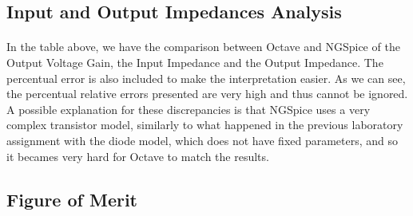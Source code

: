 \subsection{Input and Output Impedances Analysis}
\label{subsec:freqresp}

\begin{center}
   \begin{table}[H]
\end{table}
 \end{center}

\paragraph{}
In the table above, we have the comparison between Octave and NGSpice of the Output Voltage Gain, the Input Impedance and the Output Impedance. The percentual error is also included to make the interpretation easier. As we can see, the percentual relative errors presented are very high and thus cannot be ignored. A possible explanation for these discrepancies is that NGSpice uses a very complex transistor model, similarly to what happened in the previous laboratory assignment with the diode model, which does not have fixed parameters, and so it becames very hard for Octave to match the results.

\subsection{Figure of Merit}
\label{subsec:Figure_of_Merit}


